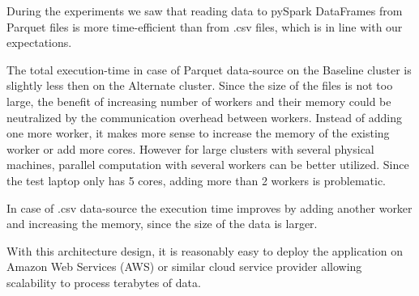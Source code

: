 \begin{table}[h]
    \centering
    \caption{Run-times of data processing tasks with different test clusters in seconds}
    \label{tab:res}
\end{table}

During the experiments we saw that reading data to pySpark DataFrames from Parquet files is more time-efficient than from .csv files, which is in line with our expectations.

The total execution-time in case of Parquet data-source on the Baseline cluster is slightly less then on the Alternate cluster. Since the size of the files is not too large, the benefit of increasing number of workers and their memory could be neutralized by the communication overhead between workers. Instead of adding one more worker, it makes more sense to increase the memory of the existing worker or add more cores. However for large clusters with several physical machines, parallel computation with several workers can be better utilized. Since the test laptop only has 5 cores, adding more than 2 workers is problematic.

In case of .csv data-source the execution time improves by adding another worker and increasing the memory, since the size of the data is larger.

With this architecture design, it is reasonably easy to deploy the application on Amazon Web Services (AWS) or similar cloud service provider allowing scalability to process terabytes of data.